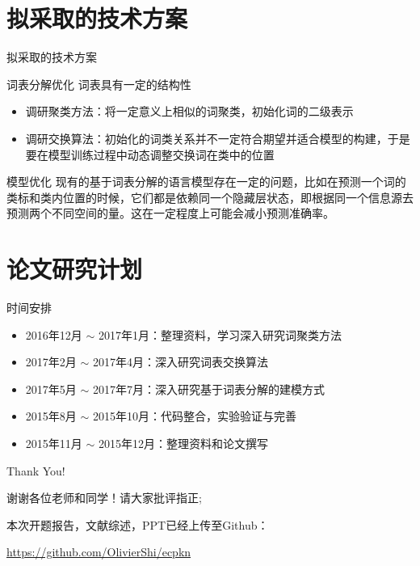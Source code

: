 \documentclass[14pt]{Bredelebeamer}
\begin{document}
\section{拟采取的技术方案}

\begin{frame}{拟采取的技术方案}
\begin{block}{词表分解优化}
词表具有一定的结构性
\begin{itemize}
\item 调研聚类方法：将一定意义上相似的词聚类，初始化词的二级表示
\item 调研交换算法：初始化的词类关系并不一定符合期望并适合模型的构建，于是要在模型训练过程中动态调整交换词在类中的位置
\end{itemize}
\end{block}
\begin{block}{模型优化}
现有的基于词表分解的语言模型存在一定的问题，比如在预测一个词的类标和类内位置的时候，它们都是依赖同一个隐藏层状态，即根据同一个信息源去预测两个不同空间的量。这在一定程度上可能会减小预测准确率。
\end{block}
\end{frame}


\section{论文研究计划}
\begin{frame}{时间安排}
	\begin{block}{}
\begin{itemize}
  \item 2016年12月 $\sim$ 2017年1月：整理资料，学习深入研究词聚类方法
  \item 2017年2月 $\sim$ 2017年4月：深入研究词表交换算法
  \item 2017年5月 $\sim$ 2017年7月：深入研究基于词表分解的建模方式
  \item 2015年8月 $\sim$ 2015年10月：代码整合，实验验证与完善
  \item 2015年11月 $\sim$ 2015年12月：整理资料和论文撰写
\end{itemize}
    \end{block}
\end{frame}


\begin{frame}
	\centering
    \Huge Thank You!
    
    \small

    谢谢各位老师和同学！请大家批评指正;

	本次开题报告，文献综述，PPT已经上传至Github：

    \url{https://github.com/OlivierShi/ecpkn}
	
\end{frame}
\end{document}

